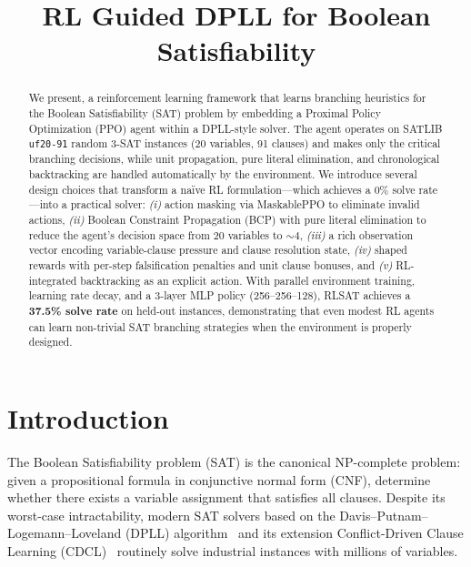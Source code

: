 \documentclass{article}
\title{RL Guided DPLL for Boolean Satisfiability}
\begin{document}
\maketitle

\begin{abstract}
We present, a reinforcement learning framework that learns branching heuristics for the Boolean Satisfiability (SAT) problem by embedding a Proximal Policy Optimization (PPO) agent within a DPLL-style solver. The agent operates on SATLIB \texttt{uf20-91} random 3-SAT instances (20 variables, 91 clauses) and makes only the critical branching decisions, while unit propagation, pure literal elimination, and chronological backtracking are handled automatically by the environment. We introduce several design choices that transform a na\"ive RL formulation---which achieves a 0\% solve rate---into a practical solver: \emph{(i)} action masking via MaskablePPO to eliminate invalid actions, \emph{(ii)} Boolean Constraint Propagation (BCP) with pure literal elimination to reduce the agent's decision space from 20 variables to ${\sim}4$, \emph{(iii)} a rich observation vector encoding variable-clause pressure and clause resolution state, \emph{(iv)} shaped rewards with per-step falsification penalties and unit clause bonuses, and \emph{(v)} RL-integrated backtracking as an explicit action. With parallel environment training, learning rate decay, and a 3-layer MLP policy (256--256--128), RLSAT achieves a \textbf{37.5\% solve rate} on held-out instances, demonstrating that even modest RL agents can learn non-trivial SAT branching strategies when the environment is properly designed.
\end{abstract}

\section{Introduction}

The Boolean Satisfiability problem (SAT) is the canonical NP-complete problem: given a propositional formula in conjunctive normal form (CNF), determine whether there exists a variable assignment that satisfies all clauses. Despite its worst-case intractability, modern SAT solvers based on the Davis--Putnam--Logemann--Loveland (DPLL) algorithm~\cite{davis1962machine} and its extension Conflict-Driven Clause Learning (CDCL)~\cite{silva1997grasp} routinely solve industrial instances with millions of variables.
\end{document}
